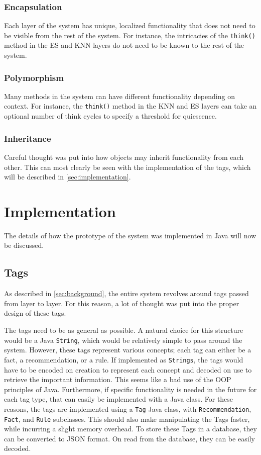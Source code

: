 \documentclass[titlepage,11pt]{article}
\newcommand{\code}[1]{\texttt{#1}}
\begin{document}
\subsubsection{Encapsulation}

Each layer of the system has unique, localized functionality that does not need to be visible from the rest of the system. For instance, the intricacies of the \code{think()} method in the ES and KNN layers do not need to be known to the rest of the system.

\subsubsection{Polymorphism}

Many methods in the system can have different functionality depending on context. For instance, the \code{think()} method in the KNN and ES layers can take an optional number of think cycles to specify a threshold for quiescence.

\subsubsection{Inheritance}

Careful thought was put into how objects may inherit functionality from each other. This can most clearly be seen with the implementation of the tags, which will be described in \autoref{sec:implementation}.

\section{Implementation}
\label{sec:implementation}

The details of how the prototype of the system was implemented in Java will now be discussed.

\subsection{Tags}

As described in \autoref{sec:background}, the entire system revolves around tags passed from layer to layer. For this reason, a lot of thought was put into the proper design of these tags.

The tags need to be as general as possible. A natural choice for this structure would be a Java \code{String}, which would be relatively simple to pass around the system. However, these tags represent various concepts; each tag can either be a fact, a recommendation, or a rule. If implemented as \code{Strings}, the tags would have to be encoded on creation to represent each concept and decoded on use to retrieve the important information. This seems like a bad use of the OOP principles of Java. Furthermore, if specific functionality is needed in the future for each tag type, that can easily be implemented with a Java class. For these reasons, the tags are implemented using a \code{Tag} Java class, with \code{Recommendation}, \code{Fact}, and \code{Rule} subclasses. This should also make manipulating the Tags faster, while incurring a slight memory overhead. To store these Tags in a database, they can be converted to JSON format. On read from the database, they can be easily decoded.
\end{document}

